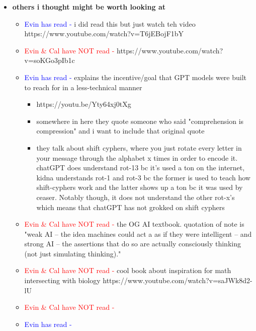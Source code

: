 \documentclass{article}
\begin{document}
\begin{itemize}
    \item \textbf{others i thought might be worth looking at}
    \begin{itemize}
        \item \textcolor{blue}{Evin has read -} \cite{butlin2023consciousness} i did read this but just watch teh video https://www.youtube.com/watch?v=T6jEBojF1bY
        \item \textcolor{red}{Evin \& Cal have NOT read - } \cite{vsevo2023intelligence} https://www.youtube.com/watch?v=soKGo3pIb1c
        \item \textcolor{blue}{Evin has read -} \cite{mccoy2023embers} explains the incentive/goal that GPT models were built to reach for in a less-technical manner
        \begin{itemize}
            \item https://youtu.be/Yty64xj0tXg
            \item somewhere in here they quote someone who said "comprehension is compression" and i want to include that original quote
            \item they talk about shift cyphers, where you just rotate every letter in your message through the alphabet x times in order to encode it. chatGPT does understand rot-13 bc it's used a ton on the internet, kidna understands rot-1 and rot-3 bc the former is used to teach how shift-cyphers work and the latter shows up a ton bc it was used by ceaser. Notably though, it does not understand the other rot-x's which means that chatGPT has not grokked on shift cyphers
        \end{itemize}
        \item \textcolor{red}{Evin \& Cal have NOT read - } \cite{norvig2002modern} the OG AI textbook. quotation of note is "weak AI -- the idea machines could act a as if they were intelligent -- and strong AI -- the assertions that do so are actually consciously thinking (not just simulating thinking)."
        \item \textcolor{red}{Evin \& Cal have NOT read - } \cite{thomson1917growth} cool book about inspiration for math intersecting with biology https://www.youtube.com/watch?v=saJWk8d2-lU
        \item \textcolor{red}{Evin \& Cal have NOT read - }
        \item \textcolor{blue}{Evin has read -}
    \end{itemize}
\end{itemize}

  
  
    
\end{document}
